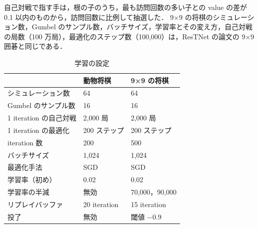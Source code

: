 \documentclass[submit]{ipsj}
\begin{document}
自己対戦で指す手は，根の子のうち，最も訪問回数の多い子との value の差が 0.1 以内のものから，訪問回数に比例して抽選した．
9×9 の将棋のシミュレーション数，Gumbel のサンプル数，バッチサイズ，学習率とその変え方，自己対戦の局数（100 万局），最適化のステップ数（100,000）は，ResTNet の論文の 9×9 囲碁と同じである．

\begin{table}[tb]
  \centering\footnotesize
  \caption{学習の設定}
  \label{tab:train}
  \setlength{\tabcolsep}{4pt}   %
  \begin{tabular}{lll}
    \toprule
    & 動物将棋 & 9×9 の将棋 \\
    \midrule
    シミュレーション数 & 64 & 64 \\
    Gumbel のサンプル数 & 16 & 16 \\
    1 iteration の自己対戦 & 2,000 局 & 2,000 局 \\
    1 iteration の最適化 & 200 ステップ & 200 ステップ \\
    iteration 数 & 200 & 500 \\
    バッチサイズ & 1,024 & 1,024 \\
    最適化手法 & SGD & SGD \\
    学習率（初め） & 0.02 & 0.02 \\
    学習率の半減 & 無効 & 70,000，90,000 \\
    リプレイバッファ & 20 iteration & 15 iteration \\
    投了 & 無効 & 閾値 $-0.9$ \\
    \bottomrule
  \end{tabular}
\end{table}
\end{document}
